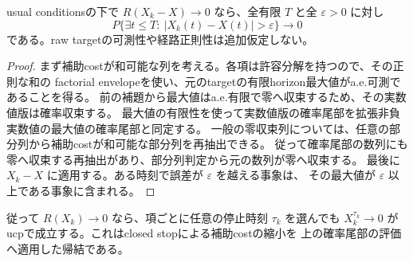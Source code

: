 \begin{lemma}[補助costの収束はucp収束を含意する]
usual conditionsの下で $R(X_k-X)\to0$ なら、全有限 $T$ と全 $\varepsilon>0$ に対し
\[
 P\{\exists t\le T:\ |X_k(t)-X(t)|>\varepsilon\}\longrightarrow0
\]
である。raw targetの可測性や経路正則性は追加仮定しない。
\end{lemma}
\begin{proof}
まず補助costが和可能な列を考える。各項は許容分解を持つので、その正則な和の
factorial envelopeを使い、元のtargetの有限horizon最大値がa.e.可測であることを得る。
前の補題から最大値はa.e.有限で零へ収束するため、その実数値版は確率収束する。
最大値の有限性を使って実数値版の確率尾部を拡張非負実数値の最大値の確率尾部と同定する。
一般の零収束列については、任意の部分列から補助costが和可能な部分列を再抽出できる。
従って確率尾部の数列にも零へ収束する再抽出があり、部分列判定から元の数列が零へ収束する。
最後に $X_k-X$ に適用する。ある時刻で誤差が $\varepsilon$ を越える事象は、
その最大値が $\varepsilon$ 以上である事象に含まれる。
\end{proof}
従って $R(X_k)\to0$ なら、項ごとに任意の停止時刻 $\tau_k$ を選んでも
$X_k^{\tau_k}\to0$ がucpで成立する。これはclosed stopによる補助costの縮小を
上の確率尾部の評価へ適用した帰結である。

